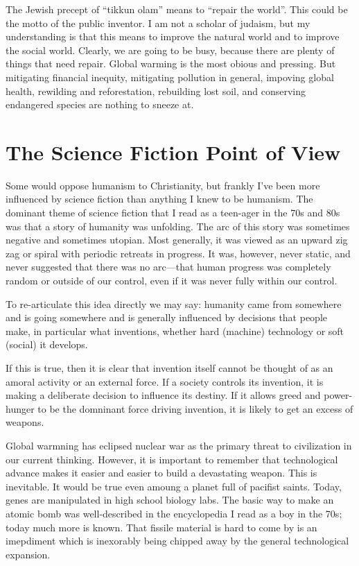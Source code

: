 \documentclass[
	fontsize=10pt, %
	twoside=false, %
	secnumdepth=1, %
]{kaobook}
\begin{document}
The Jewish precept of ``tikkun olam'' means to ``repair the world''.
This could be the motto of the public inventor.
I am not a scholar of judaism, but my understanding is that this
means to improve the natural world and to improve the social world.
Clearly, we are going to be busy, because there are plenty of things
that need repair. Global warming is the most obious and pressing.
But mitigating financial inequity, mitigating pollution in general,
impoving global health, rewilding and reforestation, rebuilding
lost soil, and conserving endangered species are nothing to sneeze at.

\chapter{The Science Fiction Point of View}

Some would oppose humanism to Christianity, but frankly I've
been more influenced by science fiction than anything I knew
to be humanism. The dominant theme of science fiction
that I read as a teen-ager in the 70s and 80s was that
a story of humanity was unfolding.
The arc of this story was sometimes negative and sometimes
utopian.
Most generally, it was viewed as an upward
zig zag or spiral with periodic retreats in progress.
It was, however, never static, and never suggested that
there was no arc---that human progress was completely random
or outside of our control, even if it was never fully within our
control.

To re-articulate this idea directly we may say:
humanity came from somewhere and is going somewhere and
is generally influenced by decisions that people make,
in particular what inventions, whether hard (machine)
technology or soft (social) it develops.

If this is true, then it is clear that invention itself
cannot be thought of as an amoral activity or an external force.
If a society controls its invention, it is making a deliberate
decision to influence its destiny.
If it allows greed and power-hunger to be the domninant
force driving invention, it is likely to get an excess of
weapons.

Global warmning has eclipsed nuclear war as the primary
threat to civilization in our current thinking.
However, it is important to remember that technological
advance makes it easier and easier to build a devastating weapon.
This is inevitable. It would be true even amoung a planet
full of pacifist saints.
Today, genes are manipulated in high school biology labs.
The basic way to make an atomic bomb was well-described in
the encyclopedia I read as a boy in the 70s; today much
more is known. That fissile material is hard to come by
is an imepdiment which is inexorably being chipped away
by the general technological expansion.
\end{document}
